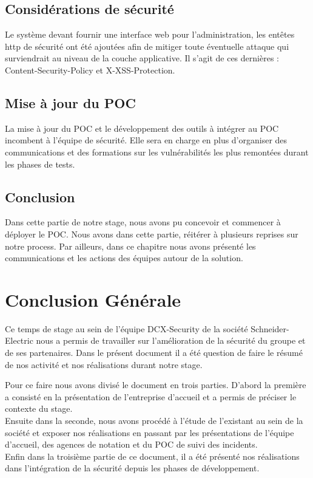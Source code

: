 \documentclass[a4paper,12pt]{book}
\theoremstyle{break}
\begin{document}
\section{Considérations de sécurité}
Le système devant fournir une interface web pour l’administration, les entêtes http de sécurité ont été ajoutées afin de mitiger toute éventuelle attaque qui surviendrait au niveau de la couche applicative. Il s’agit de ces dernières : Content-Security-Policy et X-XSS-Protection.

\section{Mise à jour du POC}
La mise à jour du POC et le développement des outils à intégrer au POC incombent à l'équipe de sécurité. Elle sera en charge en plus d'organiser des communications et des formations sur les vulnérabilités les plus remontées durant les phases de tests. 


\section{Conclusion}
Dans cette partie de notre stage, nous avons pu concevoir et commencer à déployer le POC. Nous avons dans cette partie, réitérer à plusieurs reprises sur notre process. Par ailleurs, dans ce chapitre nous avons présenté les communications et les actions des équipes autour de la solution. 


\chapter*{Conclusion Générale}
Ce temps de stage au sein de l'équipe DCX-Security de la société Schneider-Electric nous a permis de travailler sur l'amélioration de la sécurité du groupe et de ses partenaires. Dans le présent document il a été question de faire le résumé de nos activité et nos réalisations durant notre stage. 


Pour ce faire nous avons divisé le document en trois parties. D'abord la première a consisté en la présentation de l'entreprise d'accueil et a permis de préciser le contexte du stage.\\ Ensuite dans la seconde, nous avons procédé à l'étude de l'existant au sein de la société et exposer nos réalisations en passant par les présentations de l'équipe d'accueil, des agences de notation et du POC de suivi des incidents. 
\\Enfin dans la troisième partie de ce document, il a été présenté nos réalisations dans l'intégration de la sécurité depuis les phases de développement. 
\end{document}
